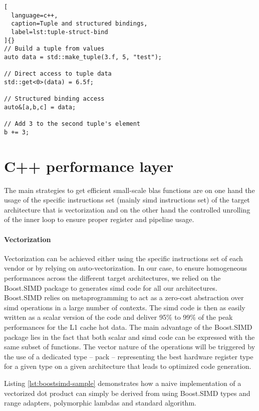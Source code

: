 \documentclass[../main]{subfiles}
\begin{document}
\begin{itemize}
\begin{lstlisting}[
  language=c++,
  caption=Tuple and structured bindings,
  label=lst:tuple-struct-bind
]{}
// Build a tuple from values
auto data = std::make_tuple(3.f, 5, "test");

// Direct access to tuple data
std::get<0>(data) = 6.5f;

// Structured binding access
auto&[a,b,c] = data;

// Add 3 to the second tuple's element
b += 3;
\end{lstlisting}

\end{itemize}

\section{
  C++ performance layer
}

The main strategies to get efficient small-scale \gls{blas}
functions are on one hand the usage of the specific
instructions set (mainly \gls{simd} instructions set) of the target
architecture that is vectorization and on the other hand the
controlled unrolling of the inner loop to ensure proper register
and pipeline usage.

\paragraph{
  Vectorization
}

Vectorization can be achieved either
using the specific instructions set of each vendor or
by relying on auto-vectorization. In our case, to ensure
homogeneous performances across the different target
architectures, we relied on the Boost.SIMD\cite{hpcs17} package
to generates \gls{simd} code for all our architectures.
Boost.SIMD relies on \cpp metaprogramming to act as
a zero-cost abstraction over \gls{simd} operations in a large
number of contexts. The \gls{simd} code is then as easily
written as a scalar version of the code and deliver 95\%
to 99\% of the peak performances for the L1 cache hot
data. The main advantage of the Boost.SIMD package
lies in the fact that both scalar and \gls{simd} code can
be expressed with the same subset of functions. The
vector nature of the operations will be triggered by
the use of a dedicated type – pack – representing the
best hardware register type for a given type on a given
architecture that leads to optimized code generation.

Listing \ref{lst:boostsimd-sample} demonstrates how a naive
implementation of a vectorized dot product can simply be
derived from using Boost.SIMD types and range adapters,
polymorphic lambdas and standard algorithm.
\end{document}
